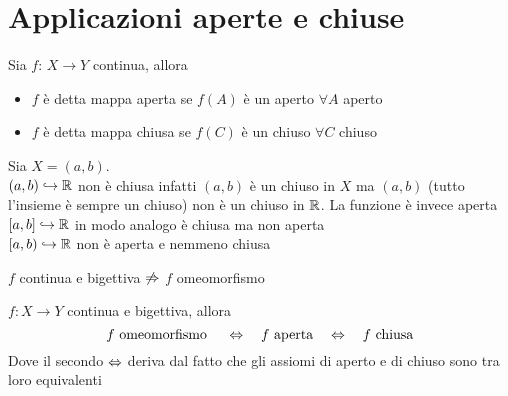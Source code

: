 \section{Applicazioni aperte e chiuse}
\begin{defn}Sia $f:\, X \to Y$ continua, allora
\begin{itemize}
\item $f$ \`e detta mappa aperta se $f(A)$ \`e un aperto $ \forall A$ aperto 
\item $f$ \`e detta mappa chiusa se $f(C)$ \`e un chiuso $\forall C$ chiuso 
\end{itemize}
\end{defn}
\begin{ese} Sia $X=(a,b)$.\\
$(a,b)\hookrightarrow \mathbb{R}$ non \`e chiusa infatti $(a,b)$ \`e un chiuso in $X$ ma $(a,b)$ (tutto l'insieme \`e sempre un chiuso) non \`e un chiuso in $\mathbb{R}$. La funzione \`e invece aperta \\
$[a,b]\hookrightarrow \mathbb{R}$ in modo analogo \`e chiusa ma non aperta\\
$[a,b)\hookrightarrow \mathbb{R}$ non \`e aperta e nemmeno chiusa
\end{ese} 
\begin{oss} $f$ continua e bigettiva $\not \Rightarrow$ $f$ omeomorfismo 
\end{oss}
\begin{oss}
$f:X\to Y$ continua e bigettiva, allora
$$ f \text{ omeomorfismo } \quad \Leftrightarrow \quad f \text{ aperta} \quad \Leftrightarrow \quad f\text{ chiusa}$$
Dove il secondo $\Leftrightarrow$ deriva dal fatto che gli assiomi di aperto e di chiuso sono tra loro equivalenti
\end{oss}
\spazio
